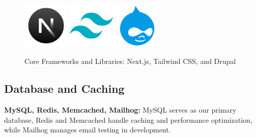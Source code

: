 \begin{figure}[H]
    \centering
    \includegraphics[width=0.2\textwidth]{images/nextjs-logo.png}
    \includegraphics[width=0.2\textwidth]{images/tailwind-logo.png}
    \includegraphics[width=0.2\textwidth]{images/drupal-logo.png}
    \caption{Core Frameworks and Libraries: Next.js, Tailwind CSS, and Drupal}
\end{figure}

\subsection{Database and Caching}
\noindent
\textbf{MySQL, Redis, Memcached, Mailhog:} MySQL serves as our primary database, Redis and Memcached handle caching and performance optimization, while Mailhog manages email testing in development.

